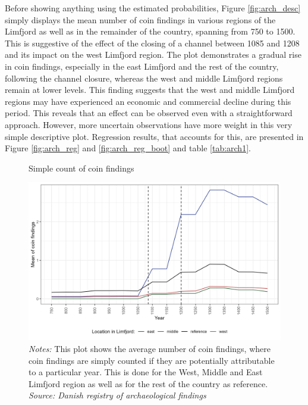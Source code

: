 \documentclass[11pt]{article}
\begin{document}
Before showing anything using the estimated probabilities, Figure \ref{fig:arch_desc} simply displays the mean number of coin findings in various regions of the Limfjord as well as in the remainder of the country, spanning from 750 to 1500. This is suggestive of the effect of the closing of a channel between 1085 and 1208 and its impact on the west Limfjord region. The plot demonstrates a gradual rise in coin findings, especially in the east Limfjord and the rest of the country, following the channel closure, whereas the west and middle Limfjord regions remain at lower levels. This finding suggests that the west and middle Limfjord regions may have experienced an economic and commercial decline during this period. This reveals that an effect can be observed even with a straightforward approach. However, more uncertain observations have more weight in this very simple descriptive plot. Regression results, that accounts for this, are presented in Figure \ref{fig:arch_reg} and \ref{fig:arch_reg_boot} and table \ref{tab:arch1}.

\begin{figure}
     \centering
     \caption{Simple count of coin findings}\label{fig:arch_desc}
     \includegraphics[width=\textwidth]{Plots/Arch_descriptive.png}
     \parbox{0.9\textwidth}{
     \caption*{\footnotesize \textit{Notes:} This plot shows the average number of coin findings, where coin findings are simply counted if they are potentially attributable to a particular year. This is done for the West, Middle and East Limfjord region as well as for the rest of the country as reference. \\ \textit{Source: Danish registry of archaeological findings}}
}
     \label{fig:regpops}
\end{figure}
\end{document}
